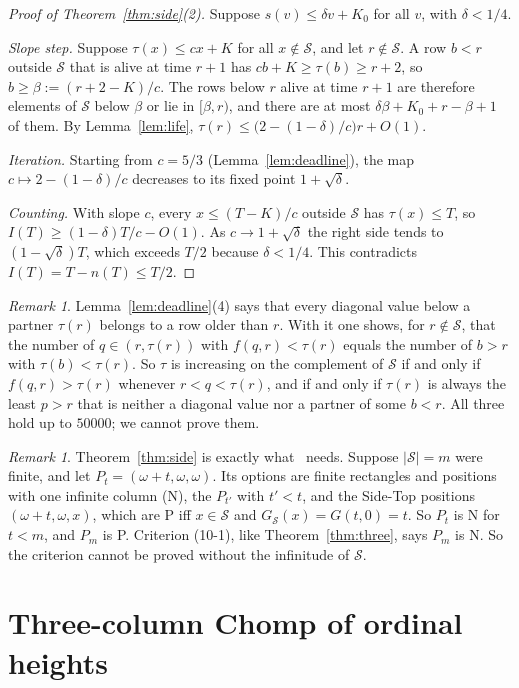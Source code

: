 \documentclass[11pt]{amsart}
\theoremstyle{definition}
\theoremstyle{remark}
\newtheorem{remark}[theorem]{Remark}
\newcommand{\Sc}{\mathcal{S}}
\newcommand{\G}{G}
\newcommand{\GS}{G_{\Sc}}
\begin{document}
\begin{proof}[Proof of Theorem~\ref{thm:side}(2)]
Suppose $s(v)\le\delta v+K_0$ for all $v$, with $\delta<1/4$.

\emph{Slope step.} Suppose $\tau(x)\le cx+K$ for all $x\notin\Sc$, and let $r\notin\Sc$. A row
$b<r$ outside $\Sc$ that is alive at time $r+1$ has $cb+K\ge\tau(b)\ge r+2$, so
$b\ge\beta:=(r+2-K)/c$. The rows below $r$ alive at time $r+1$ are therefore elements of $\Sc$
below $\beta$ or lie in $[\beta,r)$, and there are at most $\delta\beta+K_0+r-\beta+1$ of them.
By Lemma~\ref{lem:life}, $\tau(r)\le\bigl(2-(1-\delta)/c\bigr)r+O(1)$.

\emph{Iteration.} Starting from $c=5/3$ (Lemma~\ref{lem:deadline}), the map
$c\mapsto2-(1-\delta)/c$ decreases to its fixed point $1+\sqrt\delta$.

\emph{Counting.} With slope $c$, every $x\le(T-K)/c$ outside $\Sc$ has $\tau(x)\le T$, so
$I(T)\ge(1-\delta)T/c-O(1)$. As $c\to1+\sqrt\delta$ the right side tends to
$(1-\sqrt\delta)T$, which exceeds $T/2$ because $\delta<1/4$. This contradicts
$I(T)=T-n(T)\le T/2$.
\end{proof}

\begin{remark}\label{rem:greedy}
Lemma~\ref{lem:deadline}(4) says that every diagonal value below a partner $\tau(r)$ belongs to
a row older than $r$. With it one shows, for $r\notin\Sc$, that the number of $q\in(r,\tau(r))$
with $f(q,r)<\tau(r)$ equals the number of $b>r$ with $\tau(b)<\tau(r)$. So $\tau$ is increasing
on the complement of $\Sc$ if and only if $f(q,r)>\tau(r)$ whenever $r<q<\tau(r)$, and if and
only if $\tau(r)$ is always the least $p>r$ that is neither a diagonal value nor a partner of
some $b<r$. All three hold up to $50000$; we cannot prove them.
\end{remark}

\begin{remark}\label{rem:needS}
Theorem~\ref{thm:side} is exactly what~\cite{HS} needs. Suppose $|\Sc|=m$ were finite, and let
$P_t=(\omega+t,\omega,\omega)$. Its options are finite rectangles and positions with one
infinite column (N), the $P_{t'}$ with $t'<t$, and the Side-Top positions $(\omega+t,\omega,x)$,
which are P iff $x\in\Sc$ and $\GS(x)=\G(t,0)=t$. So $P_t$ is N for $t<m$, and $P_m$ is P.
Criterion (10-1), like Theorem~\ref{thm:three}, says $P_m$ is N. So the criterion cannot be
proved without the infinitude of $\Sc$.
\end{remark}

\section{Three-column Chomp of ordinal heights}\label{sec:three}
\end{document}
